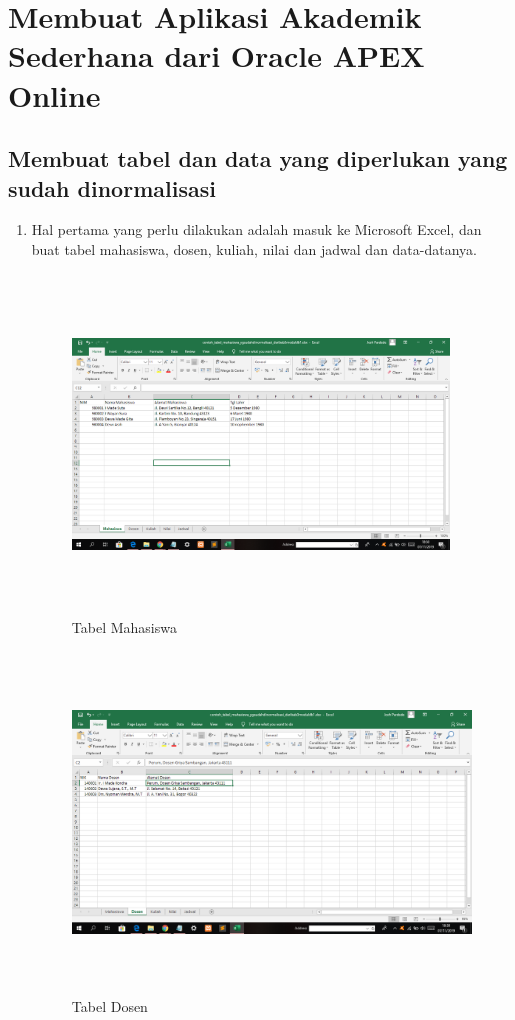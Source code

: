\chapter{Membuat Aplikasi Akademik Sederhana dari Oracle APEX Online}
\section{Membuat tabel dan data yang diperlukan yang sudah dinormalisasi  }
\par
\begin{enumerate}
    \item Hal pertama yang perlu dilakukan adalah masuk ke Microsoft Excel, dan buat tabel mahasiswa, dosen, kuliah, nilai dan jadwal dan data-datanya.
    \begin{figure}[!htbp]
\centering
\includegraphics[width=10cm,height=9cm]{figures/1tabel_mahasiswa.png}
\caption{Tabel Mahasiswa}
\label{penanda}
\end{figure}
    
\begin{figure}[!htbp]
\centering
\includegraphics[width=11cm,height=9cm]{figures/2tabel_dosen.png}
\caption{Tabel Dosen}
\label{penanda}
\end{figure}
    

\end{enumerate}
